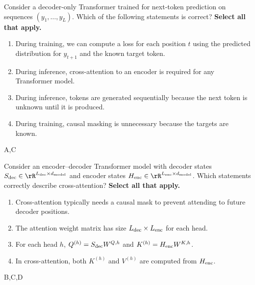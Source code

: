 \question[4]
Consider a decoder-only Transformer trained for next-token prediction on sequences \((y_1,\ldots,y_L)\). Which of the following statements is correct? \textbf{Select all that apply.}
\begin{enumerate}
\item During training, we can compute a loss for each position \(t\) using the predicted distribution for \(y_{t+1}\) and the known target token.
\item During inference, cross-attention to an encoder is required for any Transformer model.
\item During inference, tokens are generated sequentially because the next token is unknown until it is produced.
\item During training, causal masking is unnecessary because the targets are known. 
\end{enumerate}
\begin{soln}
A,C
\end{soln}

\question[4]
Consider an encoder--decoder Transformer model with decoder states \(S_\dec \in \rR^{L_\dec \times \dmodel}\) and encoder states \(H_\enc \in \rR^{L_\enc \times \dmodel}\). Which statements correctly describe cross-attention? \textbf{Select all that apply.}
\begin{enumerate}
\item Cross-attention typically needs a causal mask to prevent attending to future decoder positions. 
\item The attention weight matrix has size \(L_{\mathrm{dec}} \times L_{\mathrm{enc}}\) for each head.
\item For each head \(h\), \(Q^{(h)} = S_{\mathrm{dec}} W^{Q,h}\) and \(K^{(h)} = H_{\mathrm{enc}} W^{K,h}\).
\item In cross-attention, both \(K^{(h)}\) and \(V^{(h)}\) are computed from \(H_{\mathrm{enc}}\).
\end{enumerate}
\begin{soln}
B,C,D

\end{soln}



